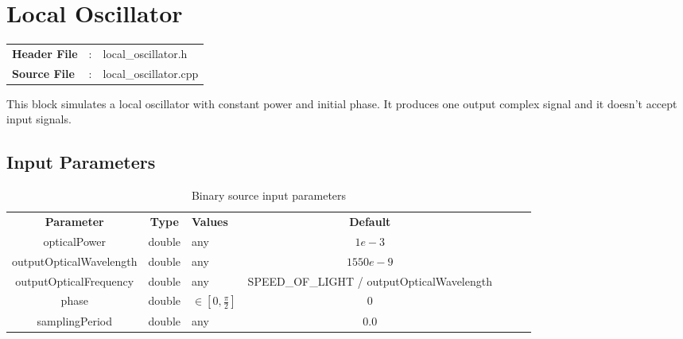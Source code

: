 \clearpage

\section{Local Oscillator}

\begin{tcolorbox}	
	\begin{tabular}{p{2.75cm} p{0.2cm} p{10.5cm}} 	
		\textbf{Header File}   &:& local\_oscillator.h \\
		\textbf{Source File}   &:& local\_oscillator.cpp \\
	\end{tabular}
\end{tcolorbox}

This block simulates a local oscillator with constant power and initial phase. It produces one output complex signal and it doesn't accept input signals.

\subsection*{Input Parameters}

\begin{table}[h]
	\centering
	\begin{tabular}{|c|c|p{60mm}|c|ccp{60mm}}
		\cline{1-4}
		\textbf{Parameter} & \textbf{Type} & \textbf{Values} &   \textbf{Default}& \\ \cline{1-4}
		opticalPower & double & any & $1e-3$ \\ \cline{1-4}
		outputOpticalWavelength & double & any & $1550e-9$ \\ \cline{1-4}
		outputOpticalFrequency & double & any &  SPEED\_OF\_LIGHT / outputOpticalWavelength \\ \cline{1-4}
		phase & double & $\in \left[0,\frac{\pi}{2}\right]$ & $0$ \\ \cline{1-4}
		samplingPeriod & double & any & $0.0$ \\ \cline{1-4}
	\end{tabular}
	\caption{Binary source input parameters}
	\label{table:LO_in_par}
\end{table}

%


